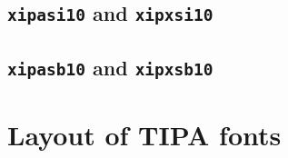 \sampletext{\rmxipa\rmfamily\bfseries\slshape\tipaencoding}

\section{\texttt{xipasi10} and \texttt{xipxsi10}}

\sampletext{\rmxipa\sffamily\slshape\tipaencoding}

\section{\texttt{xipasb10} and \texttt{xipxsb10}}

\sampletext{\rmxipa\sffamily\bfseries\tipaencoding}



\clearemptydoublepage
\chapter{Layout of TIPA fonts}\label{sec:FontLayout}


\upsiloncomment


\begingroup

\newcommand\chartsep{-5mm}
\renewcommand\chartstrut{\lower4.5pt\vbox to14pt{}}

\newpage
